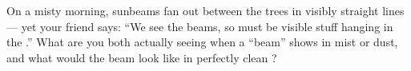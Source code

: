 \begin{exercise}[$\star\star$]\label{exo:g4:light-straight-lines:11}
On a misty morning, sunbeams fan out between the trees in visibly
straight lines --- yet your friend says: ``We see the beams, so
 must be visible stuff hanging in the .'' What are you both
actually seeing when a ``beam'' shows in mist or dust, and what
would the beam look like in perfectly clean ?
\end{exercise}
